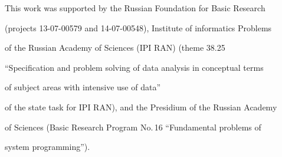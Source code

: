 \noindent

This work was supported by the Russian Foundation for Basic Research

(projects 13-07-00579 and 14-07-00548), Institute of informatics Problems

of the Russian Academy of Sciences (IPI RAN) (theme 38.25

``Specification and problem solving of data analysis in conceptual terms

of subject areas with intensive use of data''

of the state task for IPI RAN), and the Presidium of the Russian Academy

of Sciences (Basic Research Program No.\,16 ``Fundamental problems of

system programming'').





\vspace*{3pt}




